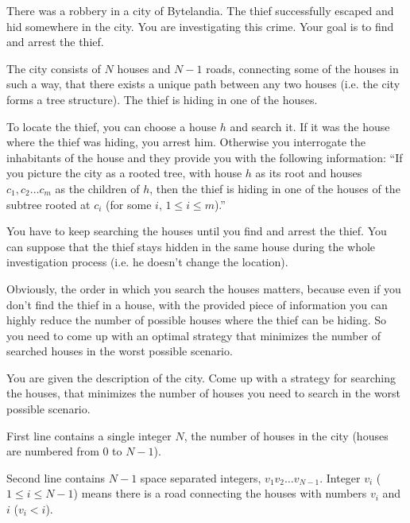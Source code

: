 





There was a robbery in a city of Bytelandia.
The thief successfully escaped and hid somewhere in the city.
You are investigating this crime. Your goal is to find and arrest the thief.

The city consists of $N$ houses and $N-1$ roads, connecting some of the houses in
such a way, that there exists a unique path between any two houses (i.e. the city forms a tree structure).
The thief is hiding in one of the houses.

To locate the thief, you can choose a house $h$ and search it.
If it was the house where the thief was hiding, you arrest him.
Otherwise you interrogate the inhabitants of the house and they provide you with the following information:
``If you picture the city as a rooted tree, with house $h$ as its root and houses $c_1, c_2 \ldots c_m$ as the children of $h$,
then the thief is hiding in one of the houses of the subtree rooted at $c_i$ (for some $i$, $1 \leq i \leq m$).''

You have to keep searching the houses until you find and arrest the thief.
You can suppose that the thief stays hidden in the same house during the whole investigation process (i.e. he doesn't change the location).

Obviously, the order in which you search the houses matters, because even if you don't
find the thief in a house, with the provided piece of information you can highly reduce
the number of possible houses where the thief can be hiding.
So you need to come up with an optimal strategy that
minimizes the number of searched houses in the worst possible scenario.


You are given the description of the city.
Come up with a strategy for searching the houses, that minimizes the number
of houses you need to search in the worst possible scenario.


First line contains a single integer $N$, the number of houses in the city (houses are numbered from $0$ to $N-1$).

Second line contains $N-1$ space separated integers, $v_1 v_2 \ldots v_{N-1}$.
Integer $v_i$ ($1 \leq i \leq N-1$) means there is a road connecting the houses with numbers $v_i$ and $i$ ($v_i < i$).

